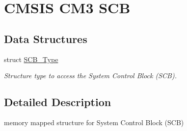 \hypertarget{group___c_m_s_i_s___c_m3___s_c_b}{\section{C\-M\-S\-I\-S C\-M3 S\-C\-B}
\label{group___c_m_s_i_s___c_m3___s_c_b}
}
\subsection*{Data Structures}
\begin{DoxyCompactItemize}
\item 
struct \hyperlink{struct_s_c_b___type}{S\-C\-B\-\_\-\-Type}
\begin{DoxyCompactList}\small\item\em Structure type to access the System Control Block (S\-C\-B). \end{DoxyCompactList}\end{DoxyCompactItemize}


\subsection{Detailed Description}
memory mapped structure for System Control Block (S\-C\-B) 